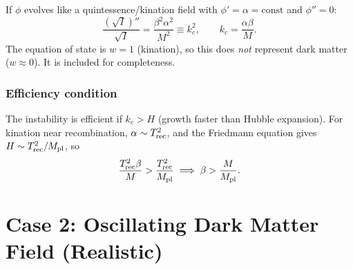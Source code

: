 \documentclass[12pt,a4paper,openany]{book}
\newcommand{\sqI}{\sqrt{I}}
\newcommand{\Mpl}{M_{\rm pl}}
\newcommand{\kc}{k_c}
\begin{document}
If $\phi$ evolves like a quintessence/kination field with $\phi' = \alpha = \text{const}$ and $\phi'' = 0$:
\begin{equation}
  \frac{(\sqI)''}{\sqI} = \frac{\beta^2\alpha^2}{M^2} \equiv \kc^2, \qquad \kc = \frac{\alpha\beta}{M}.
\end{equation}
The equation of state is $w = 1$ (kination), so this does \emph{not} represent dark matter ($w \approx 0$). It is included for completeness.

\subsubsection*{Efficiency condition}

The instability is efficient if $\kc > H$ (growth faster than Hubble expansion). For kination near recombination, $\alpha \sim T_{\rm rec}^2$, and the Friedmann equation gives $H \sim T_{\rm rec}^2/\Mpl$, so
\begin{equation}
  \frac{T_{\rm rec}^2\beta}{M} > \frac{T_{\rm rec}^2}{\Mpl} \implies \beta > \frac{M}{\Mpl}.
\end{equation}

\section{Case 2: Oscillating Dark Matter Field (Realistic)}
\end{document}
